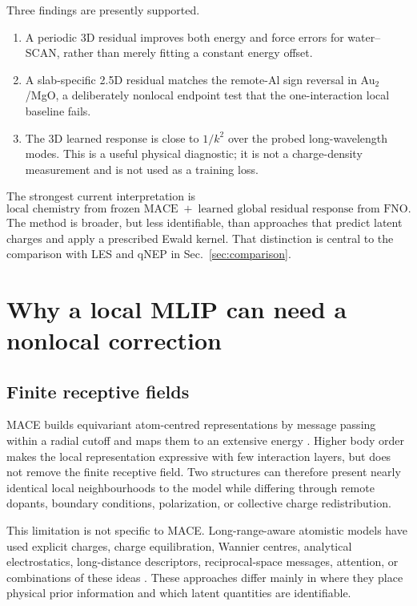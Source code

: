 \documentclass[11pt]{article}
\begin{document}
Three findings are presently supported.
\begin{enumerate}
 \item A periodic 3D residual improves both energy and force errors for
 water--SCAN, rather than merely fitting a constant energy offset.
 \item A slab-specific 2.5D residual matches the remote-Al sign reversal in
 Au$_2$/MgO, a deliberately nonlocal endpoint test that the one-interaction
 local baseline fails.
 \item The 3D learned response is close to \(1/k^2\) over the probed
 long-wavelength modes. This is a useful physical diagnostic; it is not a
 charge-density measurement and is not used as a training loss.
\end{enumerate}

The strongest current interpretation is
\[
\boxed{\text{local chemistry from frozen MACE}
\;+\;\text{learned global residual response from FNO}.}
\]
The method is broader, but less identifiable, than approaches that predict
latent charges and apply a prescribed Ewald kernel. That distinction is
central to the comparison with LES and qNEP in Sec.~\ref{sec:comparison}.

\section{Why a local MLIP can need a nonlocal correction}

\subsection{Finite receptive fields}

MACE builds equivariant atom-centred representations by message passing within
a radial cutoff and maps them to an extensive energy
\citep{batatia2022mace}. Higher body order makes the local representation
expressive with few interaction layers, but does not remove the finite
receptive field. Two structures can therefore present nearly identical local
neighbourhoods to the model while differing through remote dopants, boundary
conditions, polarization, or collective charge redistribution.

This limitation is not specific to MACE. Long-range-aware atomistic models
have used explicit charges, charge equilibration, Wannier centres, analytical
electrostatics, long-distance descriptors, reciprocal-space messages,
attention, or combinations of these ideas
\citep{grisafi2019longrange,ko2021fourth,zeng2022dplr,
unke2021spookynet,kosmala2023ewaldmp,faller2024density}. These approaches differ mainly in
where they place physical prior information and which latent quantities are
identifiable.
\end{document}
